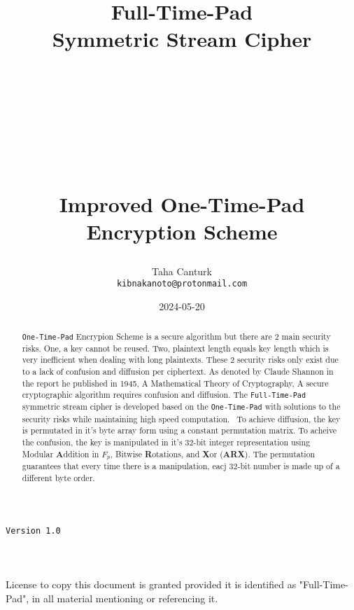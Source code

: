 \documentclass[fleqn, a4paper,12pt]{article}
\title {
	\Huge \textbf{Full-Time-Pad\\Symmetric Stream Cipher} \\
	\ \\
	\ \\
	\ \\
	\ \\
	\ \\
	\Large \textbf{Improved One-Time-Pad Encryption Scheme}

}
\author{Taha Canturk\\\texttt{kibnakanoto@protonmail.com}}
\date{2024-05-20}
\begin{document}
\maketitle
\thispagestyle{empty}


\begin{center}
		\Large \texttt{Version 1.0}
		\ \\
		\ \\
		\ \\
		\ \\
		\small License to copy this document is granted provided it is identified as "Full-Time-Pad", in all material mentioning or referencing it.
\end{center}

\newpage


\begin{abstract}
		\fontsize{12}{18}\selectfont \texttt{One-Time-Pad} Encrypion Scheme is a secure algorithm but there are 2 main security risks. One, a key cannot be reused. Two, plaintext length equals key length which is very inefficient when dealing with long plaintexts. These 2 security risks only exist due to a lack of confusion and diffusion per ciphertext. As denoted by Claude Shannon in the report he published in 1945, A Mathematical Theory of Cryptography, A secure cryptographic algorithm requires confusion and diffusion. The \texttt{Full-Time-Pad} symmetric stream cipher is developed based on the \texttt{One-Time-Pad} with solutions to the security risks while maintaining high speed computation. \
		To achieve diffusion, the key is permutated in it's byte array form using a constant permutation matrix. To acheive the confusion, the key is manipulated in it's 32-bit integer representation using Modular \textbf{A}ddition in $F_p$, Bitwise \textbf{R}otations, and \textbf{X}or (\textbf{ARX}). The permutation guarantees that every time there is a manipulation, eacj 32-bit number is made up of a different byte order.


\end{abstract}

\newpage

\tableofcontents

\newpage
\end{document}

